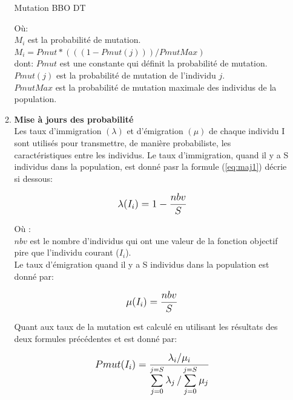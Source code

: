 \begin{enumerate}
\begin{enumerate}[label=\alph*)]
\begin{algorithm}[H]
\caption{Mutation BBO DT}
\SetAlgoLined
\DontPrintSemicolon
\large


\end{algorithm}

Où:\\
$M_i$ est la probabilité de mutation.\\
$M_i = Pmut * ( ( ( 1-Pmut(j))) / PmutMax)$ \\
dont: $Pmut$ est une constante qui définit  la probabilité de mutation.\\
$Pmut(j)$ est la probabilité de mutation de l’individu $j$. \\
$PmutMax$ est la probabilité de mutation maximale des individus de la population.\\

	\item \textbf{Mise à jours des probabilité}\\
	Les taux d’immigration $(\lambda)$ et d’émigration $(\mu)$ de chaque individu I sont utilisés pour transmettre, de manière probabiliste, les caractéristiques entre les individus.
Le taux d’immigration, quand il y a S individus dans la population, est donné pasr la formule (\ref{eq:maj1}) décrie si dessous:

\begin{equation}
	\label{eq:maj1}
	\mathlarger{
		\lambda(I_i) = 1 - \frac{nbv}{S}
	}
\end{equation}

Où :\\
$nbv$ est le nombre d’individus qui ont une valeur de la fonction objectif pire que l’individu courant ($I_i$).\\

Le taux d’émigration quand il y a S individus dans la population est donné par:

\begin{equation}
	\label{eq:maj2}
	\mathlarger{
		\mu(I_i) = \frac{nbv}{S}
	}
\end{equation}

Quant aux taux de la mutation est calculé en utilisant les résultats des deux formules précédentes et est donné par: 

\begin{equation}
	\label{eq:maj3}
	\mathlarger{
		Pmut(I_i) = \frac{
			\lambda_i / \mu_i 
		}{
			\mathlarger{\sum}_{j=0}^{j=S} \, \lambda_j  \, / \,
			\mathlarger{\sum}_{j=0}^{j=S} \, \mu_j
		}
	}
\end{equation}


\end{enumerate}
\end{enumerate}
